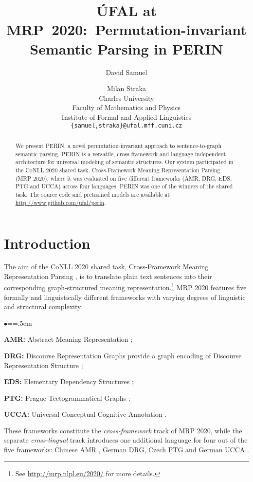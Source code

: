 \documentclass[11pt,a4paper]{article}
\title{ÚFAL at MRP~2020:\ Permutation-invariant Semantic Parsing in PERIN}
\author{David Samuel \and Milan Straka \\
  Charles University \\
  Faculty of Mathematics and Physics \\
  Institute of Formal and Applied Linguistics \\
  \texttt{\{samuel,straka\}@ufal.mff.cuni.cz}\\}
\date{}
\newenvironment{citemize}{\begin{list}{$\bullet$}{\topsep=\smallskipamount\itemsep=1pt\parsep=1pt\labelwidth=.5em}}{\end{list}}
\begin{document}
\maketitle

\begin{abstract}
We present PERIN, a novel permutation-invariant approach to sentence-to-graph semantic parsing. PERIN is a versatile, cross-framework and language independent architecture for universal modeling of semantic structures. Our system participated in the CoNLL 2020 shared task, Cross-Framework Meaning Representation Parsing (MRP 2020), where it was evaluated on five different frameworks (AMR, DRG, EDS, PTG and UCCA) across four languages. PERIN was one of the winners of the shared task. The source code and pretrained models are available at \url{http://www.github.com/ufal/perin}.
\end{abstract} \section{Introduction}

The aim of the CoNLL 2020 shared task, Cross-Framework Meaning Representation Parsing \cite[MRP 2020;][]{Oep:Abe:Abz:20}, is to translate plain text sentences into their corresponding graph-structured meaning representation.\hspace{-.08em}\footnote{See \url{http://mrp.nlpl.eu/2020/} for more details.} MRP 2020 features five formally and linguistically different frameworks with varying degrees of linguistic and structural complexity:

\begin{citemize}
  \item \textbf{AMR:} Abstract Meaning Representation \cite{banarescu2013abstract};
  \item \textbf{DRG:} Discourse Representation Graphs  \cite{abzianidze-etal-2017-parallel} provide a graph encoding of Discourse Representation Structure \cite{van1992presupposition};
  \item \textbf{EDS:} Elementary Dependency Structures \cite{oepen2006discriminant};
  \item \textbf{PTG:} Prague Tectogrammatical Graphs \cite{hajic2012announcing};
  \item \textbf{UCCA:} Universal Conceptual Cognitive Annotation \cite{abend2013universal}.
\end{citemize}

\goodbreak

\noindent
These frameworks constitute the \emph{cross-framework} track of MRP 2020, while the separate \emph{cross-lingual} track introduces one additional language for four out of the five frameworks: Chinese AMR \cite{li2016annotating}, German DRG, Czech PTG and German UCCA \cite{hershcovich-etal-2019-semeval}.
\end{document}
